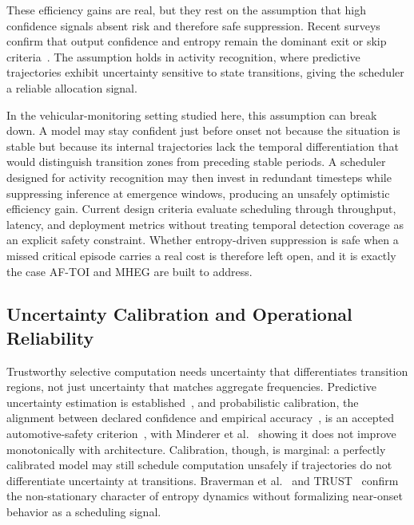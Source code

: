 \documentclass[a4paper,fleqn]{cas-dc}
\newcommand{\AFTOI}{\mbox{AF-TOI}\xspace}
\newcommand{\MHEG}{\mbox{MHEG}\xspace}
\begin{document}
These efficiency gains are real, but they rest on the assumption that high
confidence signals absent risk and therefore safe suppression. Recent surveys
confirm that output confidence and entropy remain the dominant exit or skip
criteria~\cite{rahmath2024earlyexit}. The assumption holds in activity
recognition, where predictive trajectories exhibit uncertainty sensitive to
state transitions, giving the scheduler a reliable allocation signal.

{\color{\revcolor}In the vehicular-monitoring setting studied here, this assumption can break down.} A model may stay confident
just before onset not because the situation is stable but because its internal
trajectories lack the temporal differentiation that would distinguish
transition zones from preceding stable periods. A scheduler designed for
activity recognition may then invest in redundant timesteps while suppressing
inference at emergence windows, producing an unsafely optimistic efficiency
gain. Current design criteria evaluate scheduling through throughput, latency,
and deployment metrics without treating temporal detection coverage as an
explicit safety constraint. Whether entropy-driven suppression is safe when a
missed critical episode carries a real cost is therefore left open, and it is
exactly the case \AFTOI and \MHEG are built to address.
\subsection{Uncertainty Calibration and Operational Reliability}
\label{sec:rel_uncertainty}
Trustworthy selective computation needs uncertainty that differentiates transition regions, not just uncertainty that matches aggregate frequencies. Predictive uncertainty estimation is established~\cite{gal2016dropout,lakshminarayanan2017simple,hein2019relu}, and probabilistic calibration, the alignment between declared confidence and empirical accuracy~\cite{guo2017calibration}, is an accepted automotive-safety criterion~\cite{tang2022uv,michelmore2020uq}, with Minderer et al.~\cite{minderer2021revisiting} showing it does not improve monotonically with architecture. Calibration, though, is marginal: a perfectly calibrated model may still schedule computation unsafely if trajectories do not differentiate uncertainty at transitions. Braverman et al.~\cite{braverman2020calib} and TRUST~\cite{dera2023trust} confirm the non-stationary character of entropy dynamics without formalizing near-onset behavior as a scheduling signal.
\end{document}
